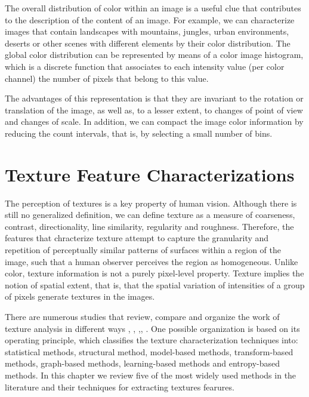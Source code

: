 The overall distribution of color within an image is a useful clue that contributes to the description of the content of an image. For example, we can characterize images that contain landscapes with mountains, jungles, urban environments, deserts or other scenes with different elements by their color distribution. The global color distribution can be represented by means of a color image histogram, which is a discrete function that associates to each intensity value (per color channel) the number of pixels that belong to this value.

The advantages of this representation is that they are invariant to the rotation or translation of the image, as well as, to a lesser extent, to changes of point of view and changes of scale. In addition, we can compact the image color information by reducing the count intervals, that is, by selecting a small number of bins.


\section{Texture Feature Characterizations}
The perception of textures is a key property of human vision. Although there is still no generalized definition, we can define texture as a measure of coarseness, contrast, directionality, line similarity, regularity and roughness. Therefore, the features that chracterize texture attempt to capture the granularity and repetition of perceptually similar patterns of surfaces within a region of the image, such that a human observer perceives the region as homogeneous.
Unlike color, texture information is not a purely pixel-level property. Texture implies the notion of spatial extent, that is, that the spatial variation of intensities of a group of pixels generate textures in the images.

There are numerous studies that review, compare and organize the work of texture analysis in different ways \citep{Materka.Strzelecki:Report:1998}, \citep{Zhang.Tan:PR:2002}, \citep{Bharati.Liu.ea:CILS:2004},\citep{Lukashevich.Sadykhov:ICPCI:2012}, \citep{Humeau-Heurtier:IEEEAccess:2019}. One possible organization is based on its operating principle, which classifies the texture characterization techniques into: statistical methods, structural method, model-based methods, transform-based methods, graph-based methods, learning-based methods and entropy-based methods. In this chapter we review five of the most widely used methods in the literature and their techniques for extracting textures fearures.

